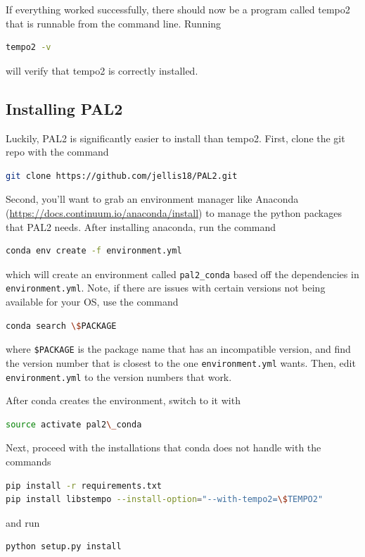\documentclass[12pt]{article}
\begin{document}
If everything worked successfully, there should now be a program called tempo2 that
is runnable from the command line. Running 

\begin{lstlisting}[language=bash]
tempo2 -v
\end{lstlisting}

will verify that tempo2 is correctly installed.

\subsection*{Installing PAL2}

Luckily, PAL2 is significantly easier to install than tempo2.
First, clone the git repo with the command
\\
\begin{lstlisting}[language=bash]
git clone https://github.com/jellis18/PAL2.git
\end{lstlisting}

Second, you'll want to grab an environment manager like Anaconda
(\url{https://docs.continuum.io/anaconda/install}) to manage the python packages that
PAL2 needs. After installing anaconda, run the command
\\
\begin{lstlisting}[language=bash]
conda env create -f environment.yml
\end{lstlisting}
which will create an environment called \texttt{pal2\_conda} based off the dependencies in
\texttt{environment.yml}. Note, if there are issues with certain versions not being
available for your OS, use the command 
\\
\begin{lstlisting}[language=bash]
conda search \$PACKAGE
\end{lstlisting}
where \texttt{\$PACKAGE} is the package name that has an incompatible version, and find
the version number that is closest to the one \texttt{environment.yml} wants. Then, edit
\texttt{environment.yml} to the version numbers that work.
	
After conda creates the environment, switch to it with 
\\
\begin{lstlisting}[language=bash]
source activate pal2\_conda
\end{lstlisting}

Next, proceed with the installations that conda does not handle with the
commands
\\
\begin{lstlisting}[language=bash]
pip install -r requirements.txt
pip install libstempo --install-option="--with-tempo2=\$TEMPO2"
\end{lstlisting}
and run
\\
\begin{lstlisting}[language=bash]
python setup.py install
\end{lstlisting}
\end{document}
